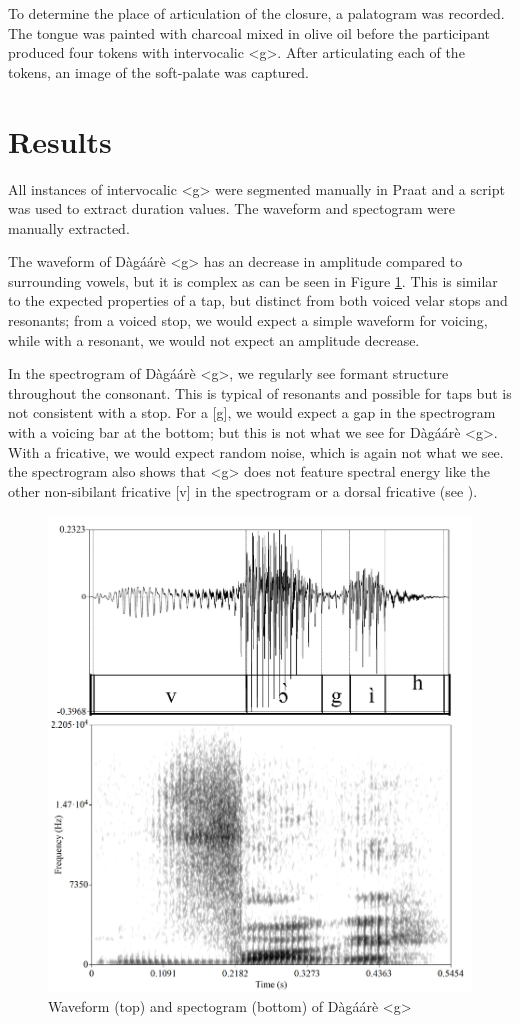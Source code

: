 \documentclass[output=paper, modfonts]{langscibook}
\begin{document}
\begin{sloppypar}
To determine the place of articulation of the closure, a palatogram was recorded. The tongue was painted with charcoal mixed in olive oil before the participant produced four tokens with intervocalic <g>. After articulating each of the tokens, an image of the soft-palate was captured.
\end{sloppypar}

\section{Results}
All instances of intervocalic <g> were segmented manually in Praat \citep{boersma2002praat} and a script was used to extract duration values. The waveform and spectogram were manually extracted.

The waveform of Dàgáárè <g> has an decrease in amplitude compared to surrounding vowels, but it is complex as can be seen in Figure \ref{tab:1:spectogram}. This is similar to the expected properties of a tap, but distinct from both voiced velar stops and resonants; from a voiced stop, we would expect a simple waveform for voicing, while with a resonant, we would not expect an amplitude decrease.

\begin{sloppypar}
In the spectrogram of Dàgáárè <g>, we regularly see formant structure throughout the consonant. This is typical of resonants and possible for taps but is not consistent with a stop. For a [g], we would expect a gap in the spectrogram with a voicing bar at the bottom; but this is not what we see for Dàgáárè <g>. With a fricative, we would expect random noise, which is again not what we see. the spectrogram also shows that <g> does not feature spectral energy like the other non-sibilant fricative [v] in the spectrogram or a dorsal fricative (see \citealt{jesus2005acoustic}).
\end{sloppypar}

\begin{figure}[H]
\includegraphics[width=0.75\linewidth]{wave_specto_vogi2.jpg}
  \caption{Waveform (top) and spectogram (bottom) of Dàgáárè <g>}
  \label{tab:1:spectogram}
\end{figure}
\end{document}
